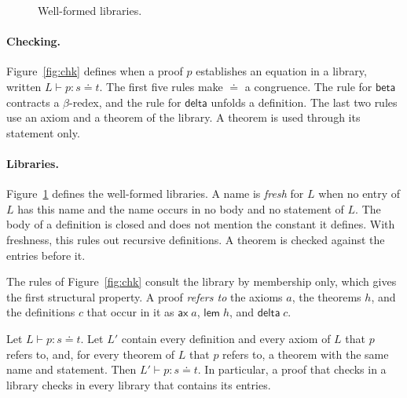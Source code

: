 \documentclass[acmsmall,nonacm,screen]{acmart}
\newcommand{\eqd}{\doteq}
\newcommand{\kw}[1]{\mathsf{#1}}
\newcommand{\chk}[4]{#1 \vdash #2 : #3 \eqd #4}
\newcommand{\wf}[1]{\vdash #1}
\newcommand{\consts}{\mathrm{consts}}
\begin{document}
\begin{figure}
\caption{Well-formed libraries.}
\label{fig:wf}
\end{figure}

\paragraph{Checking.}
Figure~\ref{fig:chk} defines when a proof $p$ establishes an equation in a library, written
$\chk{L}{p}{s}{t}$. The first five rules make $\eqd$ a congruence. The rule for $\kw{beta}$
contracts a $\beta$-redex, and the rule for $\kw{delta}$ unfolds a definition. The last two rules
use an axiom and a theorem of the library. A theorem is used through its statement only.

\paragraph{Libraries.}
Figure~\ref{fig:wf} defines the well-formed libraries. A name is \emph{fresh} for $L$ when no
entry of $L$ has this name and the name occurs in no body and no statement of $L$. The body of a
definition is closed and does not mention the constant it defines. With freshness, this rules out
recursive definitions. A theorem is checked against the entries before it.

The rules of Figure~\ref{fig:chk} consult the library by membership only, which gives the first
structural property. A proof \emph{refers to} the axioms $a$, the theorems $h$, and the
definitions $c$ that occur in it as $\kw{ax}\;a$, $\kw{lem}\;h$, and $\kw{delta}\;c$.

\begin{lemma}[Locality]
\label{lem:local}
Let $\chk{L}{p}{s}{t}$. Let $L'$ contain every definition and every axiom of $L$ that $p$ refers
to, and, for every theorem of $L$ that $p$ refers to, a theorem with the same name and statement.
Then $\chk{L'}{p}{s}{t}$. In particular, a proof that checks in a library checks in every library
that contains its entries.
\end{lemma}
\end{document}
